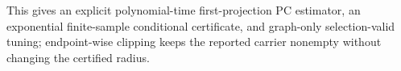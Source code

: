 This gives an explicit polynomial-time first-projection PC estimator, an exponential finite-sample conditional certificate, and graph-only selection-valid tuning; endpoint-wise clipping keeps the reported carrier nonempty without changing the certified radius.